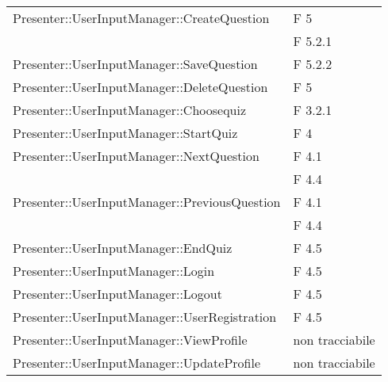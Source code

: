\begin{longtable}{p{}p{}}
\midrule
Presenter::UserInputManager::CreateQuestion	& F 5\\
											& F 5.2.1\\
\midrule
Presenter::UserInputManager::SaveQuestion	& F 5.2.2\\

\midrule
Presenter::UserInputManager::DeleteQuestion	& F 5\\

\midrule
Presenter::UserInputManager::Choosequiz		& F 3.2.1\\

\midrule
Presenter::UserInputManager::StartQuiz		& F 4\\
\midrule
Presenter::UserInputManager::NextQuestion	& F 4.1\\
											& F 4.4\\
				
\midrule
Presenter::UserInputManager::PreviousQuestion		& F 4.1\\
													& F 4.4\\
\midrule
Presenter::UserInputManager::EndQuiz		& F 4.5\\
\midrule
Presenter::UserInputManager::Login		& F 4.5\\
\midrule
Presenter::UserInputManager::Logout		& F 4.5\\
\midrule
Presenter::UserInputManager::UserRegistration		& F 4.5\\
\midrule
Presenter::UserInputManager::ViewProfile	& non tracciabile\\
\midrule
Presenter::UserInputManager::UpdateProfile	& non tracciabile\\


\end{longtable}
